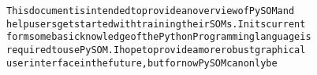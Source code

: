 {{\begin{tabbing}
{\texttt{This\hspace{6pt}document\hspace{6pt}is\hspace{6pt}intended\hspace{6pt}to\hspace{6pt}provide\hspace{6pt}an\hspace{6pt}overview\hspace{6pt}of\hspace{6pt}PySOM\hspace{6pt}and}}\\
{\texttt{help\hspace{6pt}users\hspace{6pt}get\hspace{6pt}started\hspace{6pt}with\hspace{6pt}training\hspace{6pt}their\hspace{6pt}SOMs.\hspace{12pt}In\hspace{6pt}its\hspace{6pt}current}}\\
{\texttt{form\hspace{6pt}some\hspace{6pt}basic\hspace{6pt}knowledge\hspace{6pt}of\hspace{6pt}the\hspace{6pt}Python\hspace{6pt}Programming\hspace{6pt}language\hspace{6pt}is}}\\
{\texttt{required\hspace{6pt}to\hspace{6pt}use\hspace{6pt}PySOM.\hspace{6pt}I\hspace{6pt}hope\hspace{6pt}to\hspace{6pt}provide\hspace{6pt}a\hspace{6pt}more\hspace{6pt}robust\hspace{6pt}graphical}}\\
{\texttt{user\hspace{6pt}interface\hspace{6pt}in\hspace{6pt}the\hspace{6pt}future,\hspace{6pt}but\hspace{6pt}for\hspace{6pt}now\hspace{6pt}PySOM\hspace{6pt}can\hspace{6pt}only\hspace{6pt}be}}\\

\end{tabbing}}}
